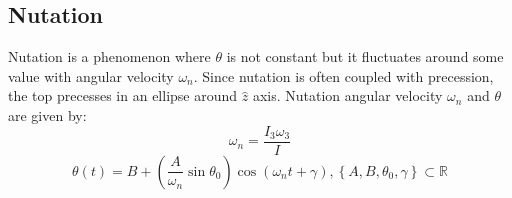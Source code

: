 \subsection{Nutation}
\label{sec:theory:nutation}

Nutation is a phenomenon where $\theta$ is not constant but it fluctuates around some value with angular velocity $\omega_{n}$. Since nutation is often coupled with precession, the top precesses in an ellipse around $\hat{z}$ axis. Nutation angular velocity $\omega_{n}$ and $\theta$ are given by:
\begin{equation}
  \label{eq:theory:nutation_frequency}
  \omega_{n} = \frac{I_{3}\omega_3}{I}
\end{equation}
\begin{equation*}
  \theta(t) = B + (\frac{A}{\omega_n}\sin \theta_{0})\cos(\omega_{n}t + \gamma), \left\{ A, B, \theta_{0}, \gamma \right\} \subset \mathbb{R}
\end{equation*}
